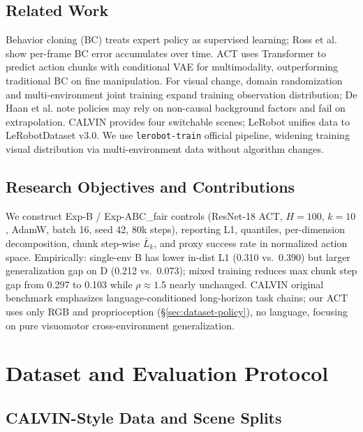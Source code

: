 \documentclass[10pt,twocolumn,letterpaper]{article}
\begin{document}
\subsection{Related Work}

Behavior cloning (BC) treats expert policy as supervised learning; Ross et al.\cite{ross2011dagger} show per-frame BC error accumulates over time. ACT\cite{zhao2023learning} uses Transformer to predict action chunks with conditional VAE for multimodality, outperforming traditional BC on fine manipulation. For visual change, domain randomization\cite{tobin2017domain} and multi-environment joint training expand training observation distribution; De Haan et al.\cite{dehaan2019causal} note policies may rely on non-causal background factors and fail on extrapolation. CALVIN\cite{mees2022calvin} provides four switchable scenes; LeRobot\cite{cadene2024lerobot,lerobot2025datasetv3} unifies data to LeRobotDataset v3.0. We use \texttt{lerobot-train} official pipeline, widening training visual distribution via multi-environment data without algorithm changes.

\subsection{Research Objectives and Contributions}

We construct Exp-B / Exp-ABC\_fair controls (ResNet-18 ACT, $H{=}100$, $k{=}10$, AdamW, batch 16, seed 42, 80k steps), reporting L1, quantiles, per-dimension decomposition, chunk step-wise $\bar{L}_k$, and proxy success rate in normalized action space. Empirically: single-env B has lower in-dist L1 (0.310 vs.\ 0.390) but larger generalization gap on D (0.212 vs.\ 0.073); mixed training reduces max chunk step gap from 0.297 to 0.103 while $\rho\approx1.5$ nearly unchanged. CALVIN original benchmark emphasizes language-conditioned long-horizon task chains\cite{mees2022calvin}; our ACT uses only RGB and proprioception (\S\ref{sec:dataset-policy}), no language, focusing on pure visuomotor cross-environment generalization.

\section{Dataset and Evaluation Protocol}

\subsection{CALVIN-Style Data and Scene Splits}
\end{document}
